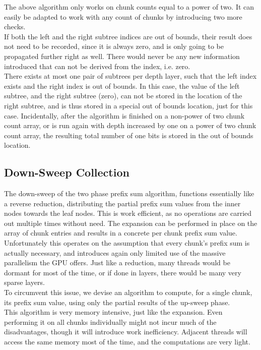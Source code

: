 \documentclass{tudscrreprt}
\begin{document}
				The above algorithm only works on chunk counts equal to a power of two. It can easily be adapted to work with any count of chunks by introducing two more checks. \\
				If both the left and the right subtree indices are out of bounds, their result does not need to be recorded, since it is always zero, and is only going to be propagated further right as well. There would never be any new information introduced that can not be derived from the index, i.e. zero. \\
				There exists at most one pair of subtrees per depth layer, such that the left index exists and the right index is out of bounds. In this case, the value of the left subtree, and the right subtree (zero), can not be stored in the location of the right subtree, and is thus stored in a special out of bounds location, just for this case. Incidentally, after the algorithm is finished on a non-power of two chunk count array, or is run again with depth increased by one on a power of two chunk count array, the resulting total number of one bits is stored in the out of bounds location. \\
			
			\subsection{Down-Sweep Collection}
				\label{sec:analysis_pss_down_sweep}
				The down-sweep of the two phase prefix sum algorithm, functions essentially like a reverse reduction, distributing the partial prefix sum values from the inner nodes towards the leaf nodes. This is work efficient, as no operations are carried out multiple times without need. The expansion can be performed in place on the array of chunk entries and results in a concrete per chunk prefix sum value. \\
				Unfortunately this operates on the assumption that every chunk's prefix sum is actually necessary, and introduces again only limited use of the massive parallelism the GPU offers. Just like a reduction, many threads would be dormant for most of the time, or if done in layers, there would be many very sparse layers. \\
				
				To circumvent this issue, we devise an algorithm to compute, for a single chunk, its prefix sum value, using only the partial results of the up-sweep phase. \\
				This algorithm is very memory intensive, just like the expansion. Even performing it on all chunks individually might not incur much of the disadvantages, though it will introduce work inefficiency. Adjacent threads will access the same memory most of the time, and the computations are very light. \\
				
\end{document}
